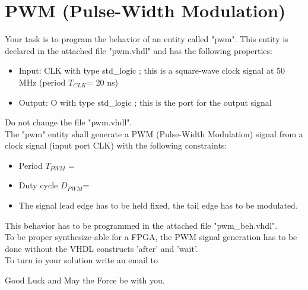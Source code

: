 \documentclass[a4paper,12pt]{article}
\begin{document}
\pagestyle{empty}
\setlength{\parindent}{0em} 
\section*{PWM (Pulse-Width Modulation)}
Your task is to program the behavior of an entity called "pwm". This entity is declared in the attached file "pwm.vhdl" and has the following properties:

\begin{itemize}
\item Input:  CLK with type std\_logic ; this is a square-wave clock signal at 50 MHz (period $T_{CLK}$= 20 ns)
\item Output: O with type std\_logic ; this is the port for the output signal
\end{itemize}
\begin{center}
\end{center}

Do not change the file "pwm.vhdl".
\\

The "pwm" entity shall generate a PWM (Pulse-Width Modulation) signal from a clock signal (input port CLK) with the following constraints:
\begin{itemize}
\item Period $T_{PWM}$ = %
\item Duty cycle $D_{PWM}$= %
\item The signal lead edge has to be held fixed, the tail edge has to be modulated.
\end{itemize}
\vspace{0.3cm}

This behavior has to be programmed in the attached file "pwm\_beh.vhdl".
\\

To be proper synthesize-able for a FPGA, the PWM signal generation has to be done without the VHDL constructs 'after' and 'wait'.
\\

To turn in your solution write an email to %

\vspace{0.7cm}

Good Luck and May the Force be with you.
\end{document}
